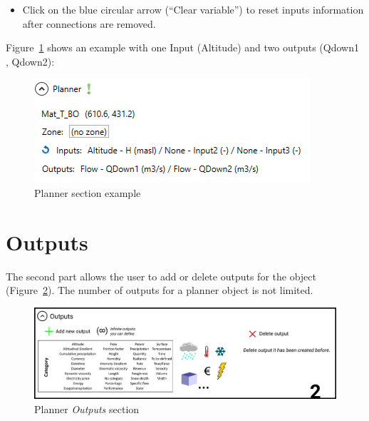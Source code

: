 \documentclass[
  letterpaper,
  DIV=11,
  numbers=noendperiod]{scrreprt}
\providecommand{\tightlist}{%
  \setlength{\itemsep}{0pt}\setlength{\parskip}{0pt}}\usepackage{longtable,booktabs,array}
\begin{document}
\begin{itemize}
\tightlist
\item
  {Click on the blue circular arrow (``Clear variable'') to reset inputs
  information after connections are removed.}
\end{itemize}

Figure~\ref{fig-planner_section_example} shows an example with one Input
(Altitude) and two outputs (Qdown1 , Qdown2):

\begin{figure}

{\centering \includegraphics{./figures/fig-planner_section_example.png}

}

\caption{\label{fig-planner_section_example}Planner section example}

\end{figure}

\hypertarget{outputs}{%
\section{Outputs}\label{outputs}}

The second part allows the user to add or delete outputs for the object
(Figure~\ref{fig-planner_outputs_section}). The number of outputs for a
planner object is not limited.

\begin{figure}

{\centering \includegraphics{./figures/fig-planner_outputs_section.png}

}

\caption{\label{fig-planner_outputs_section}Planner \emph{Outputs}
section}

\end{figure}
\end{document}
